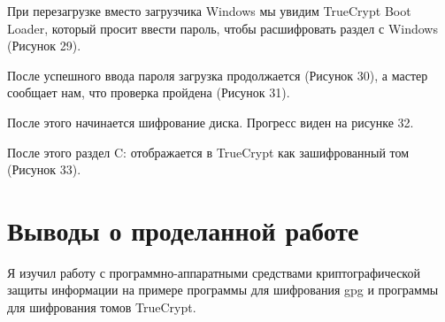 \FloatBarrier

\FloatBarrier

\FloatBarrier

\FloatBarrier

\FloatBarrier

При перезагрузке вместо загрузчика Windows мы увидим TrueCrypt Boot \linebreak Loader, который просит ввести пароль, чтобы расшифровать раздел с Windows (Рисунок 29).

\FloatBarrier

После успешного ввода пароля загрузка продолжается (Рисунок 30), а мастер сообщает нам, что проверка пройдена (Рисунок 31).

\FloatBarrier

\FloatBarrier

После этого начинается шифрование диска. Прогресс виден на рисунке 32.

\FloatBarrier

После этого раздел C: отображается в TrueCrypt как зашифрованный том (Рисунок 33).

\FloatBarrier

\clearpage


\section{Выводы о проделанной работе}
Я изучил работу с программно-аппаратными средствами криптографической защиты информации на примере программы для шифрования gpg и программы для шифрования томов TrueCrypt.

\clearpage